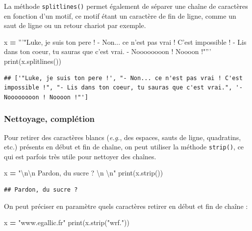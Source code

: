 \documentclass[12pt,]{book}
\newenvironment{Shaded}{\begin{snugshade}}{\end{snugshade}}
\newcommand{\CharTok}[1]{\textcolor[rgb]{0.31,0.60,0.02}{#1}}
\newcommand{\StringTok}[1]{\textcolor[rgb]{0.31,0.60,0.02}{#1}}
\newcommand{\OperatorTok}[1]{\textcolor[rgb]{0.81,0.36,0.00}{\textbf{#1}}}
\newcommand{\BuiltInTok}[1]{#1}
\newcommand{\NormalTok}[1]{#1}
\numberwithin{equation}{section}
\numberwithin{countremarque}{section}
\begin{document}
La méthode \texttt{splitlines()} permet également de séparer une chaîne
de caractères en fonction d'un motif, ce motif étant un caractère de fin
de ligne, comme un saut de ligne ou un retour chariot par exemple.

\begin{Shaded}
\begin{Highlighting}[]
\NormalTok{x }\OperatorTok{=} \StringTok{'''"Luke, je suis ton pere !}
\StringTok{- Non... ce n'est pas vrai ! C'est impossible !}
\StringTok{- Lis dans ton coeur, tu sauras que c'est vrai.}
\StringTok{- Noooooooon ! Noooon !"'''}
\BuiltInTok{print}\NormalTok{(x.splitlines())}
\end{Highlighting}
\end{Shaded}

\begin{lstlisting}
## ['"Luke, je suis ton pere !', "- Non... ce n'est pas vrai ! C'est impossible !", "- Lis dans ton coeur, tu sauras que c'est vrai.", '- Noooooooon ! Noooon !"']
\end{lstlisting}

\subsubsection{Nettoyage, complétion}\label{nettoyage-completion}

Pour retirer des caractères blancs (\emph{e.g.}, des espaces, sauts de
ligne, quadratins, etc.) présents en début et fin de chaîne, on peut
utiliser la méthode \texttt{strip()}, ce qui est parfois très utile pour
nettoyer des chaînes.

\begin{Shaded}
\begin{Highlighting}[]
\NormalTok{x }\OperatorTok{=} \StringTok{"}\CharTok{\textbackslash{}n\textbackslash{}n}\StringTok{    Pardon, du sucre ?     }\CharTok{\textbackslash{}n}\StringTok{  }\CharTok{\textbackslash{}n}\StringTok{"}
\BuiltInTok{print}\NormalTok{(x.strip())}
\end{Highlighting}
\end{Shaded}

\begin{lstlisting}
## Pardon, du sucre ?
\end{lstlisting}

On peut préciser en paramètre quels caractères retirer en début et fin
de chaîne :

\begin{Shaded}
\begin{Highlighting}[]
\NormalTok{x }\OperatorTok{=} \StringTok{"www.egallic.fr"}
\BuiltInTok{print}\NormalTok{(x.strip(}\StringTok{"wrf."}\NormalTok{))}
\end{Highlighting}
\end{Shaded}
\end{document}
